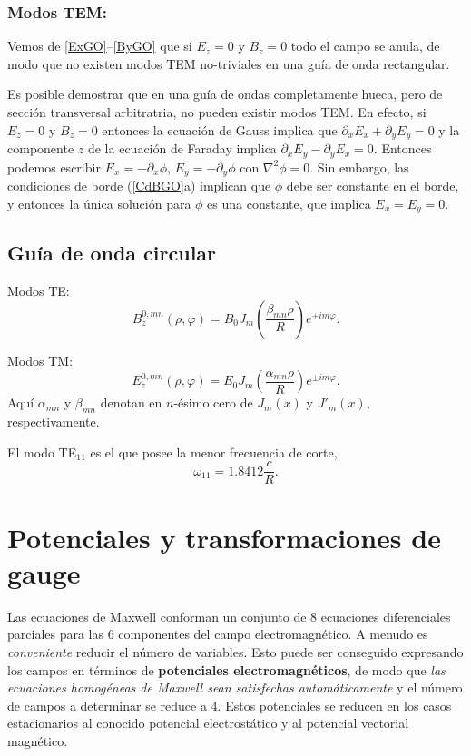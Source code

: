 \subsubsection{Modos TEM:} 

Vemos de \eqref{ExGO}--\eqref{ByGO} que si $E_z=0$ y $B_z=0$ todo el campo se anula, de modo que no existen modos TEM no-triviales en una guía de onda rectangular.

Es posible demostrar que en una guía de ondas completamente hueca, pero de sección transversal arbitratria, no pueden existir modos TEM. En efecto, si $E_z=0$ y $B_z= 0$ entonces la ecuación de Gauss implica que $\partial_xE_x+\partial_yE_y=0$ y la componente $z$ de la ecuación de Faraday implica $\partial_xE_y-\partial_yE_x=0$. Entonces podemos escribir $E_x=-\partial_x\phi$, $E_y=-\partial_y\phi$ con $\nabla^2\phi=0$. Sin embargo, las condiciones de borde (\ref{CdBGO}a) implican que $\phi$ debe ser constante en el borde, y entonces la única solución para $\phi$ es una constante, que implica $E_x=E_y=0$.

\subsection{Guía de onda circular}

Modos TE:
\begin{equation}
B_z^{0,mn}(\rho,\varphi)=B_0J_m(\frac{\beta_{mn}\rho}{R})e^{\pm im\varphi}.
\end{equation}

Modos TM:	
\begin{equation}
E_z^{0,mn}(\rho,\varphi)=E_0J_m(\frac{\alpha_{mn}\rho}{R})e^{\pm im\varphi}.
\end{equation}
Aquí $\alpha_{mn}$ y $\beta_{mn}$ denotan en $n$-ésimo cero de $J_m(x)$ y $J'_m(x)$, respectivamente.

El modo TE$_{11}$ es el que posee la menor frecuencia de corte,
\begin{equation}
\omega_{11}=1.8412\frac{c}{R}.
\end{equation}


\section{Potenciales y transformaciones de gauge}

Las ecuaciones de Maxwell conforman un conjunto de 8 ecuaciones diferenciales
parciales para las 6 componentes del campo electromagnético. A menudo es
\textit{conveniente} reducir el número de variables. Esto puede ser conseguido
expresando los campos en términos de \textbf{potenciales electromagnéticos},
de modo que \textit{las ecuaciones homogéneas de Maxwell sean satisfechas
automáticamente} y el número de campos a determinar se reduce a 4. Estos
potenciales se reducen en los casos estacionarios al conocido potencial
electrostático y al potencial vectorial magnético.

